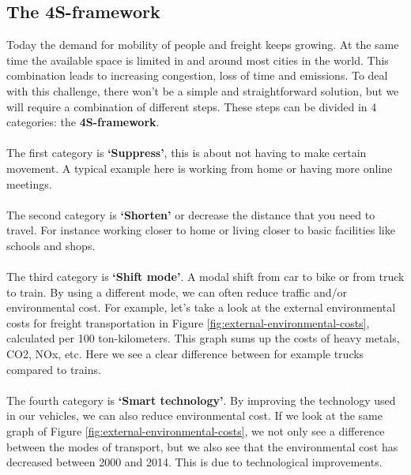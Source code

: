 \documentclass[../summary.tex]{subfiles}
\begin{document}
	\newpage
	\subsection{The 4S-framework}
	
	Today the demand for mobility of people and freight keeps growing. At the same time the available space is limited in and around most cities in the world. This combination leads to increasing congestion, loss of time and emissions. To deal with this challenge, there won't be a simple and straightforward solution, but we will require a combination of different steps. These steps can be divided in 4 categories: the \textbf{4S-framework}.
	\\\\
	The first category is \textbf{‘Suppress’}, this is about not having to make certain movement. A typical example here is working from home or having more online meetings.
	\\\\
	The second category is \textbf{‘Shorten’} or decrease the distance that you need to travel. For instance working closer to home or living closer to basic facilities like schools and shops.
	\\\\
	The third category is \textbf{‘Shift mode’}. A modal shift from car to bike or from truck to train. By using a different mode, we can often reduce traffic and/or environmental cost. For example, let’s take a look at the external environmental costs for freight transportation in Figure \ref{fig:external-environmental-costs}, calculated per 100 ton-kilometers. This graph sums up the costs of heavy metals, CO2, NOx, etc. Here we see a clear difference between for example trucks compared to trains.
	\\\\	
	The fourth category is \textbf{‘Smart technology’}. By improving the technology used in our vehicles, we can also reduce environmental cost. If we look at the same graph of Figure \ref{fig:external-environmental-costs}, we not only see a difference between the modes of transport, but we also see that the environmental cost has decreased between 2000 and 2014. This is due to technological improvements. 
	
\end{document}
